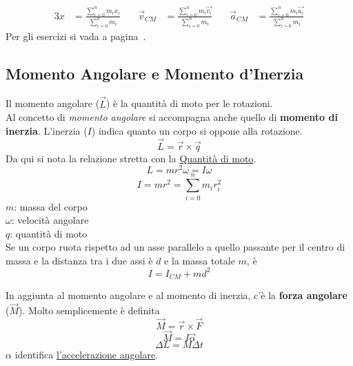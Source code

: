 \begin{alignat*}{3}
  x &= \frac{\sum\limits_{i=0}^{n} m_ix_i}{\sum\limits_{i=0}^{n} m_i} &\quad
  \vec{v}_{CM} &= \frac{\sum\limits_{i=0}^{n} m_i\vec{v_i}}{\sum\limits_{i=0}^{n} m_i} &\quad
  \vec{a}_{CM} &= \frac{\sum\limits_{i=0}^{n} m_i\vec{a_i}}{\sum\limits_{i=0}^{n} m_i}
\end{alignat*}
Per gli esercizi si vada a pagina~\pageref{ex:cm}.

\subsection{Momento Angolare e Momento d'Inerzia}\label{subsec:dinamica:inerzia}
Il momento angolare ($\vec{L}$) è la quantità di moto per le rotazioni.\\
Al concetto di \emph{momento angolare} si accompagna anche quello di \textbf{momento di inerzia}. 
L'inerzia ($I$) indica quanto un corpo si oppone alla rotazione.\\
\begin{equation*}
  \vec{L} = \vec{r} \times \vec{q}
\end{equation*}
Da qui si nota la relazione stretta con la \hyperref[subsec:qtaMoto]{Quantità di moto}.
\begin{equation*}
  L = mr^2\omega = I\omega
\end{equation*}
\begin{equation*}
  I = mr^2 = \sum\limits_{i=0}^{n}m_ir_i^2
\end{equation*}
$m$: massa del corpo\\
$\omega$: velocità angolare\\
$q$: quantità di moto\\[\baselineskip]
Se un corpo ruota rispetto ad un asse parallelo a quello passante per il centro di massa e la distanza
tra i due assi è $d$ e la massa totale $m$, è
\begin{equation*}
  I = I_{CM}+md^2
\end{equation*}
\begin{center}
\end{center}
In aggiunta al momento angolare e al momento di inerzia, c'è la \textbf{forza angolare} ($\vec{M}$).
Molto semplicemente è definita
\begin{equation*}
  \vec{M} = \vec{r}\times\vec{F}
\end{equation*}
\begin{equation*}
  \vec{M} = I\vec{\alpha}
\end{equation*}
\begin{equation*}
  \Delta L = M\Delta t
\end{equation*}
$\alpha$ identifica \hyperref[subsec:mrua]{l'accelerazione angolare}.\\

